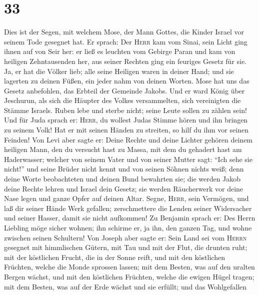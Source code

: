 \hypertarget{section-32}{%
\section{33}\label{section-32}}

 Dies ist der Segen, mit welchem Mose, der Mann Gottes,
die Kinder Israel vor seinem Tode gesegnet hat.  Er
sprach: Der \textsc{Herr} kam vom Sinai, sein Licht ging ihnen auf von
Seir her: er ließ es leuchten vom Gebirge Paran und kam von heiligen
Zehntausenden her, aus seiner Rechten ging ein feuriges Gesetz für sie.
 Ja, er hat die Völker lieb; alle seine Heiligen waren in
deiner Hand; und sie lagerten zu deinen Füßen, ein jeder nahm von deinen
Worten.  Mose hat uns das Gesetz anbefohlen, das Erbteil
der Gemeinde Jakobs.  Und er ward König über Jeschurun,
als sich die Häupter des Volkes versammelten, sich vereinigten die
Stämme Israels.  Ruben lebe und sterbe nicht; seine Leute
sollen zu zählen sein!  Und für Juda sprach er:
\textsc{Herr}, du wollest Judas Stimme hören und ihn bringen zu seinem
Volk! Hat er mit seinen Händen zu streiten, so hilf du ihm vor seinen
Feinden!  Von Levi aber sagte er: Deine Rechte und deine
Lichter gehören deinem heiligen Mann, den du versucht hast zu Massa, mit
dem du gehadert hast am Haderwasser;  welcher von seinem
Vater und von seiner Mutter sagt: ``Ich sehe sie nicht!'' und seine
Brüder nicht kennt und von seinen Söhnen nichts weiß; denn deine Worte
beobachteten und deinen Bund bewahrten sie;  die werden
Jakob deine Rechte lehren und Israel dein Gesetz; sie werden Räucherwerk
vor deine Nase legen und ganze Opfer auf deinen Altar. 
Segne, \textsc{Herr}, sein Vermögen, und laß dir seiner Hände Werk
gefallen; zerschmettere die Lenden seiner Widersacher und seiner Hasser,
damit sie nicht aufkommen!  Zu Benjamin sprach er: Des
Herrn Liebling möge sicher wohnen; ihn schirme er, ja ihn, den ganzen
Tag, und wohne zwischen seinen Schultern!  Von Joseph
aber sagte er: Sein Land sei vom \textsc{Herrn} gesegnet mit himmlischen
Gütern, mit Tau und mit der Flut, die drunten ruht;  mit
der köstlichen Frucht, die in der Sonne reift, und mit den köstlichen
Früchten, welche die Monde sprossen lassen;  mit dem
Besten, was auf den uralten Bergen wächst, und mit den köstlichen
Früchten, welche die ewigen Hügel tragen;  mit dem
Besten, was auf der Erde wächst und sie erfüllt; und das Wohlgefallen
